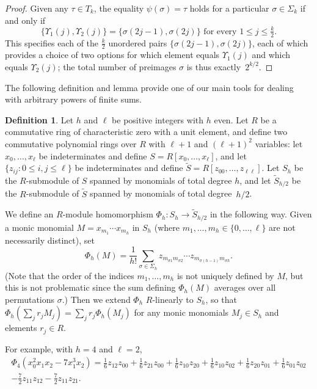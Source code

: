 \documentclass[12pt,reqno]{amsart}
\theoremstyle{definition}
\newtheorem{definition}[theorem]{Definition}
\begin{document}
\begin{proof}
Given any $\tau\in T_k$, the equality $\psi(\sigma) = \tau$ holds for a particular $\sigma\in\Sigma_k$ if and only if
\begin{equation} \label{Upsilons}
\{\Upsilon_1(j),\Upsilon_2(j)\} = \{\sigma(2j-1),\sigma(2j)\} \text{ for every }1\le j\le \tfrac k2.
\end{equation}
This specifies each of the $\frac k2$ unordered pairs $\{\sigma(2j-1),\sigma(2j)\}$, each of which provides a choice of two options for which element equals $\Upsilon_1(j)$ and which equals $\Upsilon_2(j)$; the total number of preimages $\sigma$ is thus exactly~$2^{k/2}$.
\end{proof}

The following definition and lemma provide one of our main tools for dealing with arbitrary powers of finite sums.

\begin{definition} \label{Phih def}
Let $h$ and $\ell$ be positive integers with $h$ even. Let $R$ be a commutative ring of characteristic zero with a unit element, and define two commutative polynomial rings over $R$ with $\ell+1$ and $(\ell+1)^2$ variables: let $x_0,\dots,x_\ell$ be indeterminates and define $S=R[x_0,\dots,x_\ell]$, and let $\{ z_{ij} \colon 0\le i, j\le \ell \}$ be indeterminates and define $\tilde S = R[z_{00},\dots,z_{\ell\ell}]$. Let $S_h$ be the $R$-submodule of $S$ spanned by monomials of total degree $h$, and let $\tilde S_{h/2}$ be the $R$-submodule of $\tilde S$ spanned by monomials of total degree~$h/2$.

We define an $R$-module homomorphism $\Phi_h \colon S_h \to \tilde S_{h/2}$ in the following way. Given a monic monomial $M=x_{m_1} \cdots x_{m_h}$ in $S_h$ (where $m_1,\dots,m_h \in \{0,\dots,\ell\}$ are not necessarily distinct), set
\[
\Phi_h(M) = \frac1{h!} \sum_{\sigma\in\Sigma_h} z_{m_{\sigma1}m_{\sigma2}} \cdots z_{m_{\sigma(h-1)}m_{\sigma h}}.
\]
(Note that the order of the indices $m_1,\dots,m_h$ is not uniquely defined by $M$, but this is not problematic since the sum defining $\Phi_h(M)$ averages over all permutations $\sigma$.)
Then we extend $\Phi_h$ $R$-linearly to $S_h$, so that $\Phi_h(\sum_j r_j M_j) = \sum_j r_j \Phi_h(M_j)$ for any monic monomials $M_j \in S_h$ and elements $r_j\in R$.

For example, with $h=4$ and $\ell=2$,
\begin{multline*}
\Phi_4(x_0^2x_1x_2 - 7x_1^3x_2) = \tfrac16z_{12}z_{00} + \tfrac16z_{21}z_{00} + \tfrac16z_{10}z_{20} + \tfrac16z_{10}z_{02} + \tfrac16z_{20}z_{01} + \tfrac16z_{01}z_{02} \\
- \tfrac72z_{11}z_{12} - \tfrac72z_{11}z_{21}.
\end{multline*}
\end{definition}
\end{document}
